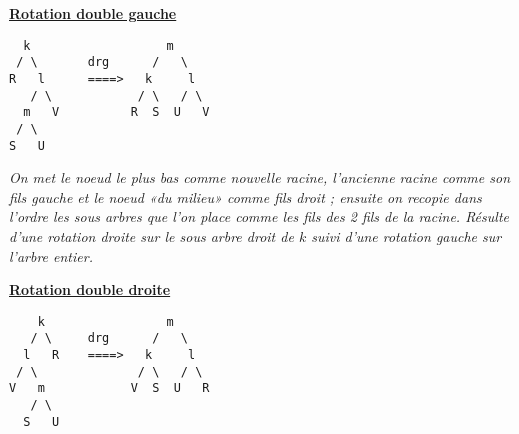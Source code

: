 \documentclass{article}
\newcommand{\stitre}[1]{\noindent\textbf{\underline{#1}} \\}
\begin{document}
\stitre{Rotation double gauche}

\begin{lstlisting}
  k                   m
 / \       drg      /   \
R   l      ====>   k     l
   / \            / \   / \
  m   V          R  S  U   V
 / \            
S   U           
\end{lstlisting}

\noindent\textit{On met le noeud le plus bas comme nouvelle racine, l'ancienne racine comme son fils gauche et le 
noeud «du milieu» comme fils droit ; ensuite on recopie dans l'ordre les sous arbres que l'on place comme les
fils des 2 fils de la racine. Résulte d'une rotation droite sur le sous arbre droit de $k$ suivi d'une rotation 
gauche sur l'arbre entier.}

\newpage

\stitre{Rotation double droite}

\begin{lstlisting}
    k                 m
   / \     drg      /   \
  l   R    ====>   k     l
 / \              / \   / \
V   m            V  S  U   R
   / \            
  S   U 
\end{lstlisting}
\end{document}
